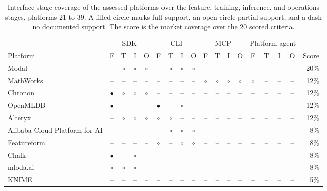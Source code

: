 \begin{landscape}
\begin{table}[p]\centering
\caption[Complete market assessment, interface stage coverage, platforms 21 to 39]{Interface stage coverage of the assessed platforms over the feature, training, inference, and operations stages, platforms 21 to 39. A filled circle marks full support, an open circle partial support, and a dash no documented support. The score is the market coverage over the 20 scored criteria.}
\label{tab:market-coverage-full-b}
{\scriptsize\setlength{\tabcolsep}{4pt}
\begin{tabular}{l cccc cccc cccc cccc r}
\toprule
 & \multicolumn{4}{c}{\gls{SDK}} & \multicolumn{4}{c}{\gls{CLI}} & \multicolumn{4}{c}{\gls{MCP}} & \multicolumn{4}{c}{Platform agent} & \\
\cmidrule(lr){2-5}\cmidrule(lr){6-9}\cmidrule(lr){10-13}\cmidrule(lr){14-17}
Platform & F & T & I & O & F & T & I & O & F & T & I & O & F & T & I & O & Score \\
\midrule
Modal & -- & $\circ$ & $\circ$ & $\circ$ & -- & $\circ$ & $\circ$ & $\circ$ & -- & -- & -- & -- & -- & -- & -- & -- & 20\% \\
MathWorks & -- & -- & -- & -- & -- & -- & -- & -- & $\circ$ & $\circ$ & $\circ$ & $\circ$ & $\circ$ & -- & -- & -- & 12\% \\
Chronon & $\bullet$ & $\circ$ & $\circ$ & $\circ$ & -- & -- & -- & -- & -- & -- & -- & -- & -- & -- & -- & -- & 12\% \\
OpenMLDB & $\bullet$ & -- & -- & -- & $\bullet$ & -- & $\circ$ & -- & -- & -- & -- & -- & -- & -- & -- & -- & 12\% \\
Alteryx & -- & $\circ$ & $\circ$ & $\circ$ & $\circ$ & $\circ$ & -- & -- & -- & -- & -- & -- & -- & -- & -- & -- & 12\% \\
Alibaba Cloud Platform for AI & -- & -- & -- & -- & -- & $\circ$ & $\circ$ & $\circ$ & -- & -- & -- & -- & -- & -- & -- & -- & 8\% \\
Featureform & -- & -- & -- & -- & $\circ$ & -- & $\circ$ & $\circ$ & -- & -- & -- & -- & -- & -- & -- & -- & 8\% \\
Chalk & $\bullet$ & -- & $\circ$ & -- & -- & -- & -- & -- & -- & -- & -- & -- & -- & -- & -- & -- & 8\% \\
mloda.ai & $\circ$ & $\circ$ & $\circ$ & -- & -- & -- & -- & -- & -- & -- & -- & -- & -- & -- & -- & -- & 8\% \\
KNIME & -- & -- & -- & -- & -- & -- & -- & -- & -- & -- & -- & -- & -- & -- & -- & -- & 5\% \\

\end{tabular}}
\end{table}
\end{landscape}
